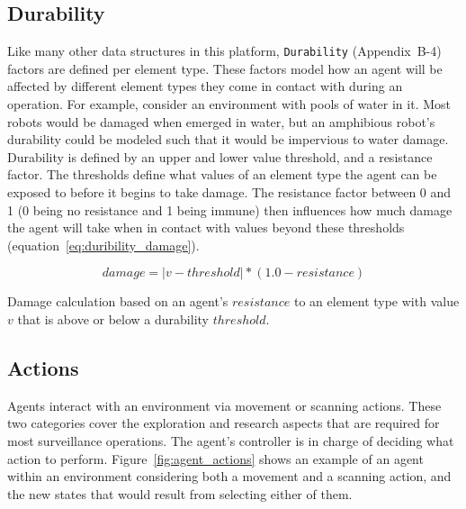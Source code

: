 \subsection{Durability} \label{subsec:durability}
Like many other data structures in this platform, \texttt{Durability} (Appendix~B-4) factors are defined per element type.
These factors model how an agent will be affected by different element types they come in contact with during an operation.
For example, consider an environment with pools of water in it.
Most robots would be damaged when emerged in water, but an amphibious robot's durability could be modeled such that it would be impervious to water damage.
Durability is defined by an upper and lower value threshold, and a resistance factor.
The thresholds define what values of an element type the agent can be exposed to before it begins to take damage.
The resistance factor between 0 and 1 (0 being no resistance and 1 being immune) then influences how much damage the agent will take when in contact with values beyond these thresholds (equation~\ref{eq:duribility_damage}).

\begin{capeq}[H]
  \begin{equation} \label{eq:duribility_damage}
    damage = |v - threshold| * (1.0 - resistance)
  \end{equation}
  \caption[Agent Damage]{Damage calculation based on an agent's $resistance$ to an element type with value $v$ that is above or below a durability $threshold$.}
\end{capeq}

\subsection{Actions} \label{subsec:actions}
Agents interact with an environment via movement or scanning actions.
These two categories cover the exploration and research aspects that are required for most surveillance operations.
The agent's controller is in charge of deciding what action to perform.
Figure~\ref{fig:agent_actions} shows an example of an agent within an environment considering both a movement and a scanning action, and the new states that would result from selecting either of them.

